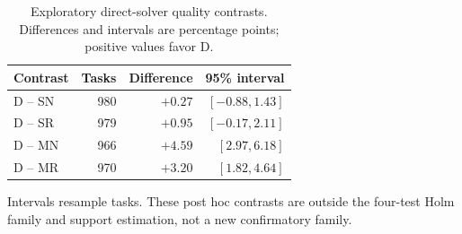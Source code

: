 \begin{table}[t]
\caption{Exploratory direct-solver quality contrasts. Differences and intervals are percentage points; positive values favor D.}
\label{tab:direct-contrasts}
\centering\small
\begin{tabular}{@{}lrrr@{}}
\toprule
Contrast & Tasks & Difference & 95\% interval\\
\midrule
D -- SN & 980 & $+0.27$ & $[-0.88, 1.43]$\\
D -- SR & 979 & $+0.95$ & $[-0.17, 2.11]$\\
D -- MN & 966 & $+4.59$ & $[2.97, 6.18]$\\
D -- MR & 970 & $+3.20$ & $[1.82, 4.64]$\\
\bottomrule
\end{tabular}
\par\smallskip\noindent Intervals resample tasks. These post hoc contrasts are outside the four-test Holm family and support estimation, not a new confirmatory family.
\end{table}
